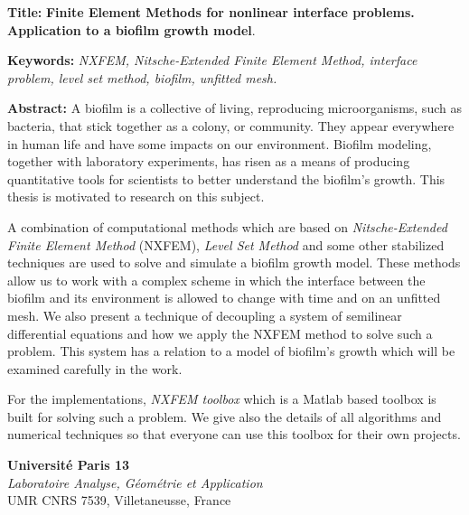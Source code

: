 \documentclass[12pt,a4paper]{article}
\begin{document}
\smallskip


\begin{tcolorbox}[standard jigsaw, colframe=black!60, opacityback=0]

\smallskip

\textbf{\color{tblue}Title:} {\color{black!90}\textbf{Finite Element Methods for nonlinear interface problems. Application to a biofilm growth model}.}

\medskip

\textbf{\color{tblue}Keywords:} \textit{NXFEM, Nitsche-Extended Finite Element Method, interface problem, level set method, biofilm, unfitted mesh.}

\medskip

\textbf{\color{tblue}Abstract:} A biofilm is a collective of living, reproducing microorganisms, such as bacteria, that stick together as a colony, or community. They appear everywhere in human life and have some impacts on our environment. Biofilm modeling, together with laboratory experiments, has risen as a means of producing quantitative tools for scientists to better understand the biofilm's growth. This thesis is motivated to research on this subject. \smallskip

A combination of computational methods which are based on \textit{Nitsche-Extended Finite Element Method} (NXFEM), \textit{Level Set Method} and some other stabilized techniques are used to solve and simulate a biofilm growth model. These methods allow us to work with a complex scheme in which the interface between the biofilm and its environment is allowed to change with time and on an unfitted mesh. We also present a technique of decoupling a system of semilinear differential equations and how we apply the NXFEM method to solve such a problem. This system has a relation to a model of biofilm's growth which will be examined carefully in the work. \smallskip

For the implementations, \textit{NXFEM toolbox} which is a Matlab based toolbox is built for solving such a problem. We give also the details of all algorithms and numerical techniques so that everyone can use this toolbox for their own projects.

\smallskip

\end{tcolorbox}

\begin{center}
\textbf{\color{black!90}Université Paris 13}\\
\textit{Laboratoire Analyse, Géométrie et Application}\\
UMR CNRS 7539, Villetaneusse, France
\end{center}
\end{document}
